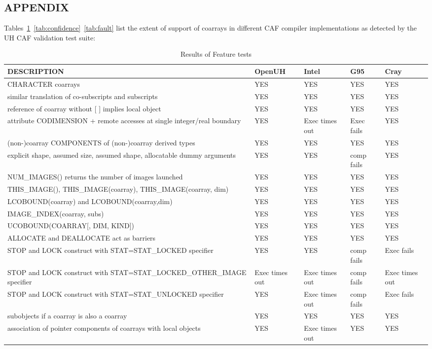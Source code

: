 \subsection{APPENDIX}

Tables~\ref{tab:feature}~\ref{tab:confidence}~\ref{tab:fault} list the extent of support of coarrays in different CAF compiler implementations as detected by the UH CAF validation test suite:

\begin{table}[tbh!]
\small
\caption{Results of Feature tests}
\label{tab:feature}
\begin{tabular}{|p{7cm}|p{1.5cm}|p{1.5cm}|p{1.5cm}|p{1.5cm}|}
\hline
DESCRIPTION  & OpenUH & Intel & G95 & Cray\\\hline
CHARACTER coarrays & YES & YES & YES & YES\\\hline
similar translation of co-subscripts and subscripts & YES & YES & YES & YES\\\hline
reference of coarray without [ ] implies local object & YES & YES & YES & YES\\\hline
attribute CODIMENSION + remote accesses at single integer/real boundary & YES & Exec times out & Exec fails & YES\\\hline
(non-)coarray COMPONENTS of (non-)coarray derived types & YES & YES & YES & YES\\\hline
explicit shape, assumed size, assumed shape, allocatable dummy arguments & YES & YES & comp fails& YES\\\hline
NUM\_IMAGES() returns the number of images launched & YES & YES & YES & YES\\\hline
THIS\_IMAGE(), THIS\_IMAGE(coarray), THIS\_IMAGE(coarray, dim) & YES & YES & YES &YES\\\hline
LCOBOUND(coarray) and LCOBOUND(coarray,dim) & YES & YES & YES & YES\\\hline
IMAGE\_INDEX(coarray, subs) & YES & YES & YES & YES\\\hline
UCOBOUND(COARRAY[, DIM, KIND]) & YES & YES & YES& YES\\\hline
ALLOCATE and DEALLOCATE act as barriers & YES & YES & YES & YES\\\hline
STOP and LOCK construct with STAT=STAT\_LOCKED specifier & YES & YES & comp fails & Exec fails\\\hline
STOP and LOCK construct with STAT=STAT\_LOCKED\_OTHER\_IMAGE specifier & Exec times out & Exec times out & comp fails & Exec times out\\\hline
STOP and LOCK construct with STAT=STAT\_UNLOCKED specifier & YES & Exec times out & comp fails& Exec fails\\\hline
subobjects if a coarray is also a coarray & YES & YES & YES& YES\\\hline
association of pointer components of coarrays with local objects & YES & Exec times out & YES & YES\\\hline
\end{tabular}
\end{table}

